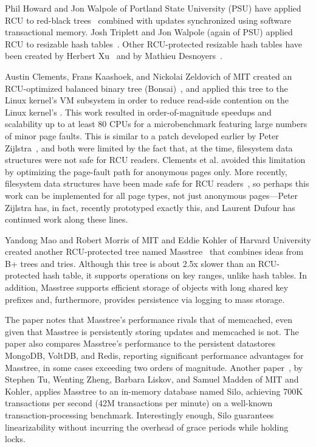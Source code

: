 Phil Howard and Jon Walpole of Portland State University (PSU) have
applied RCU to red-black
trees~\cite{PhilHowardPhD,PhilHoward2011RCUTMRBTree} combined with updates
synchronized using software transactional memory.
Josh Triplett and Jon Walpole (again of PSU) applied RCU to resizable
hash tables~\cite{JoshTriplettPhD,Triplett:2011:RPHash,JonCorbet2014RCUhash1,JonCorbet2014RCUhash2}.
Other RCU-protected resizable hash tables have been created by
Herbert Xu~\cite{HerbertXu2010RCUResizeHash} and by
Mathieu Desnoyers~\cite{PaulMcKenney2013LWNURCUhash}.

Austin Clements, Frans Kaashoek, and Nickolai Zeldovich
of MIT created an RCU-optimized balanced binary tree
(Bonsai)~\cite{AustinClements2012RCULinux:mmapsem}, and applied this
tree to the Linux kernel's VM subsystem in order to reduce read-side
contention on the Linux kernel's .
This work resulted in order-of-magnitude speedups and scalability up to
at least 80 CPUs for a microbenchmark featuring large numbers of minor
page faults.
This is similar to a patch developed earlier by
Peter Zijlstra~\cite{PeterZijlstra2014SpeculativePageFault}, and both
were limited by the fact that, at the time, filesystem data structures
were not safe for RCU readers.
Clements et al. avoided this limitation by optimizing the page-fault
path for anonymous pages only.
More recently, filesystem data structures have been made safe for RCU
readers~\cite{JonathanCorbet2010dcacheRCU,JonathanCorbet2011dcacheRCUbug},
so perhaps this work can be implemented for all page types, not just
anonymous pages---Peter Zijlstra has, in fact, recently prototyped
exactly this, and Laurent Dufour has continued work along these lines.

Yandong Mao and Robert Morris of MIT and Eddie Kohler of
Harvard University created another RCU-protected tree named
Masstree~\cite{Mao:2012:CCF:2168836.2168855} that combines ideas from B+
trees and tries.
Although this tree is about 2.5x slower than an RCU-protected hash table,
it supports operations on key ranges, unlike hash tables.
In addition, Masstree supports efficient storage of objects with long
shared key prefixes and, furthermore, provides persistence via logging
to mass storage.

The paper notes that Masstree's performance rivals that of memcached, even
given that Masstree is persistently storing updates and memcached is not.
The paper also compares Masstree's performance to the persistent
datastores MongoDB, VoltDB, and Redis, reporting significant performance
advantages for Masstree, in some cases exceeding two orders of magnitude.
Another paper~\cite{Tu:2013:STM:2517349.2522713}, by Stephen Tu,
Wenting Zheng, Barbara Liskov, and Samuel Madden of MIT and Kohler,
applies Masstree to an in-memory database named Silo, achieving 700K
transactions per second (42M transactions per minute) on a well-known
transaction-processing benchmark.
Interestingly enough, Silo guarantees linearizability without incurring
the overhead of grace periods while holding locks.

